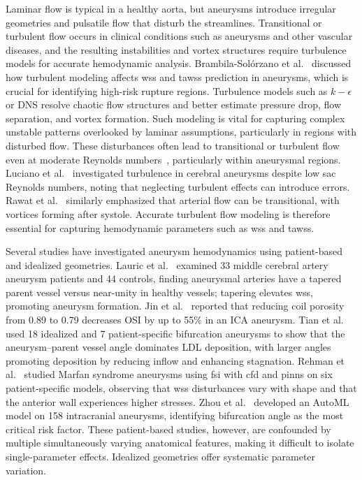 \documentclass[12pt,a4paper]{article}
\newcommand{\CFD}{\ac{cfd}\xspace}
\newcommand{\FSI}{\ac{fsi}\xspace}
\newcommand{\PINNs}{\acp{pinn}\xspace}
\newcommand{\WSS}{\ac{wss}\xspace}
\newcommand{\TAWSS}{\ac{tawss}\xspace}
\newcommand{\OSI}{\ac{OSI}\xspace}
\newcommand{\ICA}{\ac{ICA}\xspace}
\newcommand{\DNS}{\ac{DNS}\xspace}
\newcommand{\LDL}{\ac{LDL}\xspace}
\theoremstyle{definition}
\numberwithin{equation}{section}
\begin{document}
Laminar flow is typical in a healthy aorta, but aneurysms introduce irregular geometries and pulsatile flow that disturb the streamlines. Transitional or turbulent flow occurs in clinical conditions such as aneurysms and other vascular diseases, and the resulting instabilities and vortex structures require turbulence models for accurate hemodynamic analysis. Brambila-Solórzano et al.~\cite{brambila2023influence} discussed how turbulent modeling affects \WSS and \TAWSS prediction in aneurysms, which is crucial for identifying high-risk rupture regions. Turbulence models such as $k-\epsilon$ or \DNS resolve chaotic flow structures and better estimate pressure drop, flow separation, and vortex formation. Such modeling is vital for capturing complex unstable patterns overlooked by laminar assumptions, particularly in regions with disturbed flow. These disturbances often lead to transitional or turbulent flow even at moderate Reynolds numbers~\cite{evju2015assumption}, particularly within aneurysmal regions. Luciano et al.~\cite{luciano2024turbulent} investigated turbulence in cerebral aneurysms despite low sac Reynolds numbers, noting that neglecting turbulent effects can introduce errors. Rawat et al.~\cite{rawat2019numerical} similarly emphasized that arterial flow can be transitional, with vortices forming after systole. Accurate turbulent flow modeling is therefore essential for capturing hemodynamic parameters such as \WSS and \TAWSS.

Several studies have investigated aneurysm hemodynamics using patient-based and idealized geometries. Lauric et al.~\cite{lauric2019proximal} examined 33 middle cerebral artery aneurysm patients and 44 controls, finding aneurysmal arteries have a tapered parent vessel versus near-unity in healthy vessels; tapering elevates \WSS, promoting aneurysm formation. Jin et al.~\cite{jin2023cfd} reported that reducing coil porosity from 0.89 to 0.79 decreases \OSI by up to 55\% in an \ICA aneurysm. Tian et al.~\cite{tian2023influence} used 18 idealized and 7 patient-specific bifurcation aneurysms to show that the aneurysm--parent vessel angle dominates \LDL deposition, with larger angles promoting deposition by reducing inflow and enhancing stagnation. Rehman et al.~\cite{ur2025fluid} studied Marfan syndrome aneurysms using \FSI with \CFD and \PINNs on six patient-specific models, observing that \WSS disturbances vary with shape and that the anterior wall experiences higher stresses. Zhou et al.~\cite{zhou2026morphological} developed an AutoML model on 158 intracranial aneurysms, identifying bifurcation angle as the most critical risk factor. These patient-based studies, however, are confounded by multiple simultaneously varying anatomical features, making it difficult to isolate single-parameter effects. Idealized geometries offer systematic parameter variation.
\end{document}
